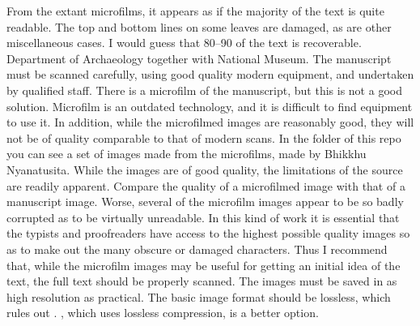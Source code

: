 {}From the extant microfilms, it appears as if the majority of the text is quite readable. The top and bottom lines on some leaves are damaged, as are other miscellaneous cases. I would guess that 80\markdownRendererPercentSign{}–90\markdownRendererPercentSign{} of the text is recoverable.\markdownRendererInterblockSeparator
{}\markdownRendererUlBeginTight
\markdownRendererUlItem {} Department of Archaeology together with National Museum.\markdownRendererUlItemEnd 
\markdownRendererUlEndTight \markdownRendererInterblockSeparator
{}\markdownRendererInterblockSeparator
{}The manuscript must be scanned carefully, using good quality modern equipment, and undertaken by qualified staff.\markdownRendererInterblockSeparator
{}There is a microfilm of the manuscript, but this is not a good solution. Microfilm is an outdated technology, and it is difficult to find equipment to use it. In addition, while the microfilmed images are reasonably good, they will not be of quality comparable to that of modern scans. In the  folder of this repo you can see a set of images made from the microfilms, made by Bhikkhu Nyanatusita. While the images are of good quality, the limitations of the source are readily apparent. Compare the quality of a microfilmed image with that of a manuscript image.\markdownRendererInterblockSeparator
{}\markdownRendererInterblockSeparator
{}\markdownRendererInterblockSeparator
{}Worse, several of the microfilm images appear to be so badly corrupted as to be virtually unreadable.\markdownRendererInterblockSeparator
{}\markdownRendererInterblockSeparator
{}In this kind of work it is essential that the typists and proofreaders have access to the highest possible quality images so as to make out the many obscure or damaged characters. Thus I recommend that, while the microfilm images may be useful for getting an initial idea of the text, the full text should be properly scanned.\markdownRendererInterblockSeparator
{}The images must be saved in as high resolution as practical. The basic image format should be lossless, which rules out . , which uses lossless compression, is a better option.\markdownRendererInterblockSeparator
